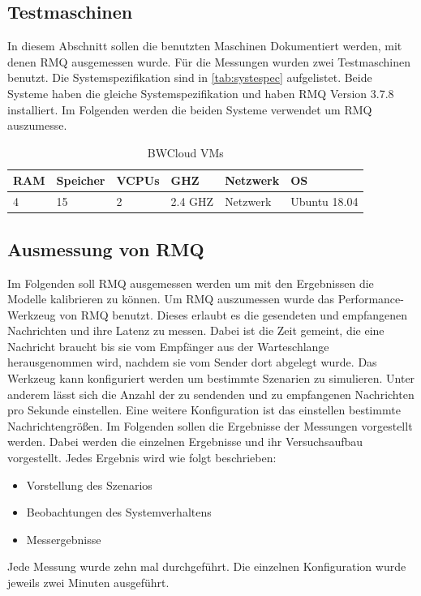 \subsection{Testmaschinen}
\label{sec:testmachine}
In diesem Abschnitt sollen die benutzten Maschinen Dokumentiert werden, mit denen RMQ ausgemessen wurde. Für die Messungen wurden zwei Testmaschinen benutzt. Die Systemspezifikation sind in \autoref{tab:systespec} aufgelistet. Beide Systeme haben die gleiche Systemspezifikation und haben RMQ Version 3.7.8 installiert. Im Folgenden werden die beiden Systeme verwendet um RMQ auszumesse.

\begin{table}
  \begin{tabular}{|l|l|l|l|l|l|}
    RAM & Speicher & VCPUs & GHZ & Netzwerk & OS \\
    \hline
     4 & 15 & 2 & 2.4 GHZ & Netzwerk & Ubuntu 18.04
  \end{tabular}
	\caption{\label{tab:systespec} BWCloud VMs}
\end{table}

\subsection{Ausmessung von RMQ}
\label{sec:rmqBenchmark}
Im Folgenden soll RMQ ausgemessen werden um mit den Ergebnissen die Modelle kalibrieren zu können. Um RMQ auszumessen wurde das Performance-Werkzeug von RMQ benutzt. Dieses erlaubt es die gesendeten und empfangenen Nachrichten und ihre Latenz zu messen. Dabei ist die Zeit gemeint, die eine Nachricht braucht bis sie vom Empfänger aus der Warteschlange herausgenommen wird, nachdem sie vom Sender dort abgelegt wurde. Das Werkzeug kann konfiguriert werden um bestimmte Szenarien zu simulieren. Unter anderem lässt sich die Anzahl der zu sendenden und zu empfangenen Nachrichten pro Sekunde einstellen. Eine weitere Konfiguration ist das einstellen bestimmte Nachrichtengrößen. Im Folgenden sollen die Ergebnisse der Messungen vorgestellt werden. Dabei werden die einzelnen Ergebnisse und ihr Versuchsaufbau vorgestellt. Jedes Ergebnis wird wie folgt beschrieben: 
\begin{itemize}
    \item Vorstellung des Szenarios
    \item Beobachtungen des Systemverhaltens
    \item Messergebnisse
\end{itemize}
Jede Messung wurde zehn mal durchgeführt. Die einzelnen Konfiguration wurde jeweils zwei Minuten ausgeführt. 



